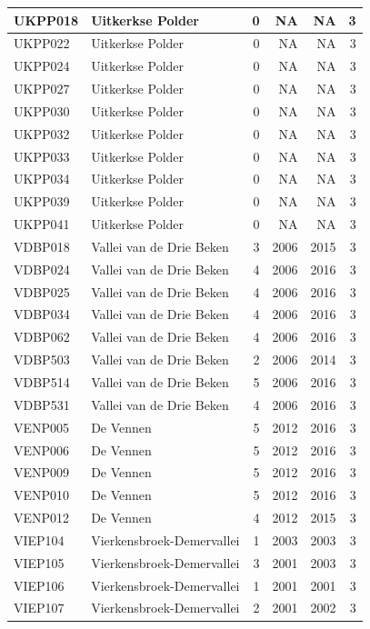 \documentclass[11pt,]{book}
\begin{document}
\begin{table}
\begin{tabular}[t]{l|l|r|r|r|r}
\hline
UKPP018 & Uitkerkse Polder & 0 & NA & NA & 3\\
\hline
UKPP022 & Uitkerkse Polder & 0 & NA & NA & 3\\
\hline
UKPP024 & Uitkerkse Polder & 0 & NA & NA & 3\\
\hline
UKPP027 & Uitkerkse Polder & 0 & NA & NA & 3\\
\hline
UKPP030 & Uitkerkse Polder & 0 & NA & NA & 3\\
\hline
UKPP032 & Uitkerkse Polder & 0 & NA & NA & 3\\
\hline
UKPP033 & Uitkerkse Polder & 0 & NA & NA & 3\\
\hline
UKPP034 & Uitkerkse Polder & 0 & NA & NA & 3\\
\hline
UKPP039 & Uitkerkse Polder & 0 & NA & NA & 3\\
\hline
UKPP041 & Uitkerkse Polder & 0 & NA & NA & 3\\
\hline
VDBP018 & Vallei van de Drie Beken & 3 & 2006 & 2015 & 3\\
\hline
VDBP024 & Vallei van de Drie Beken & 4 & 2006 & 2016 & 3\\
\hline
VDBP025 & Vallei van de Drie Beken & 4 & 2006 & 2016 & 3\\
\hline
VDBP034 & Vallei van de Drie Beken & 4 & 2006 & 2016 & 3\\
\hline
VDBP062 & Vallei van de Drie Beken & 4 & 2006 & 2016 & 3\\
\hline
VDBP503 & Vallei van de Drie Beken & 2 & 2006 & 2014 & 3\\
\hline
VDBP514 & Vallei van de Drie Beken & 5 & 2006 & 2016 & 3\\
\hline
VDBP531 & Vallei van de Drie Beken & 4 & 2006 & 2016 & 3\\
\hline
VENP005 & De Vennen & 5 & 2012 & 2016 & 3\\
\hline
VENP006 & De Vennen & 5 & 2012 & 2016 & 3\\
\hline
VENP009 & De Vennen & 5 & 2012 & 2016 & 3\\
\hline
VENP010 & De Vennen & 5 & 2012 & 2016 & 3\\
\hline
VENP012 & De Vennen & 4 & 2012 & 2015 & 3\\
\hline
VIEP104 & Vierkensbroek-Demervallei & 1 & 2003 & 2003 & 3\\
\hline
VIEP105 & Vierkensbroek-Demervallei & 3 & 2001 & 2003 & 3\\
\hline
VIEP106 & Vierkensbroek-Demervallei & 1 & 2001 & 2001 & 3\\
\hline
VIEP107 & Vierkensbroek-Demervallei & 2 & 2001 & 2002 & 3\\

\end{tabular}
\end{table}
\end{document}
